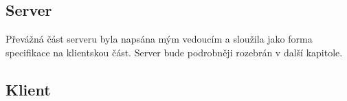 \subsection{Server}
Převážná část serveru byla napsána mým vedoucím a sloužila jako forma specifikace na klientskou část. Server bude podrobněji rozebrán v další kapitole.

\subsection{Klient}
